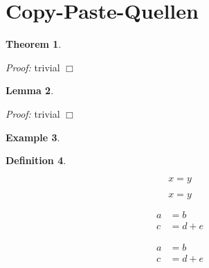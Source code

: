 \documentclass[a4paper,11pt,notitlepage,fullpage]{paper}
\theoremstyle{plain}
\newtheorem{thm}{Theorem}[section] %
\newtheorem{lem}[thm]{Lemma}
\theoremstyle{definition}
\newtheorem{defn}[thm]{Definition} %
\newtheorem{exmp}[thm]{Example} %
\begin{document}
\section{Copy-Paste-Quellen}



\begin{thm}

\end{thm}
\emph{Proof:} trivial \hfill $\Box$

\begin{lem}

\end{lem}
\emph{Proof:} trivial \hfill $\Box$


\begin{exmp}

\end{exmp}


\begin{defn}

\end{defn}



\begin{equation}
x = y
\end{equation}


\begin{equation*}
x = y
\end{equation*}


\begin{align}
a &= b \\
c &= d + e
\end{align}


\begin{align*}
a &= b \\
c &= d + e
\end{align*}





%
%
\end{document}

